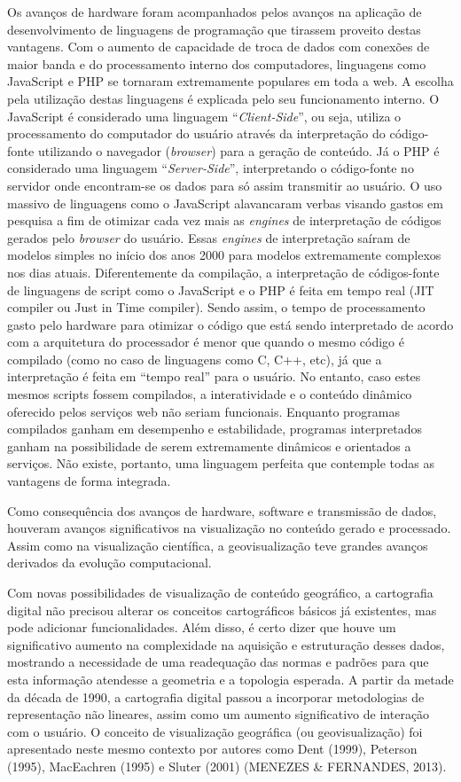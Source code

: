 Os avanços de hardware foram acompanhados pelos avanços na aplicação de desenvolvimento de linguagens de programação que tirassem proveito destas vantagens. Com o aumento de capacidade de troca de dados com conexões de maior banda e do processamento interno dos computadores, linguagens como JavaScript e PHP se tornaram extremamente populares em toda a web. A escolha pela utilização destas linguagens é explicada pelo seu funcionamento interno. O JavaScript é considerado uma linguagem “\textit{Client-Side}”, ou seja, utiliza o processamento do computador do usuário através da interpretação do código-fonte utilizando o navegador (\textit{browser}) para a geração de conteúdo. Já o PHP é considerado uma linguagem “\textit{Server-Side}”, interpretando o código-fonte no servidor onde encontram-se os dados para só assim transmitir ao usuário. O uso massivo de linguagens como o JavaScript alavancaram verbas visando gastos em pesquisa a fim de otimizar cada vez mais as \textit{engines} de interpretação de códigos gerados pelo \textit{browser} do usuário. Essas \textit{engines} de interpretação saíram de modelos simples no início dos anos 2000 para modelos extremamente complexos nos dias atuais. Diferentemente da compilação, a interpretação de códigos-fonte de linguagens de script como o JavaScript e o PHP é feita em tempo real (JIT compiler ou Just in Time compiler). Sendo assim, o tempo de processamento gasto pelo hardware para otimizar o código que está sendo interpretado de acordo com a arquitetura do processador é menor que quando o mesmo código é compilado (como no caso de linguagens como C, C++, etc), já que a interpretação é feita em “tempo real” para o usuário. No entanto, caso estes mesmos scripts fossem compilados, a interatividade e o conteúdo dinâmico oferecido pelos serviços web não seriam funcionais. Enquanto programas compilados ganham em desempenho e estabilidade, programas interpretados ganham na possibilidade de serem extremamente dinâmicos e orientados a serviços. Não existe, portanto, uma linguagem perfeita que contemple todas as vantagens de forma integrada. 

Como consequência dos avanços de hardware, software e transmissão de dados, houveram avanços significativos na visualização no conteúdo gerado e processado. Assim como na visualização científica, a geovisualização teve grandes avanços derivados da evolução computacional. 

Com novas possibilidades de visualização de conteúdo geográfico, a cartografia digital não precisou alterar os conceitos cartográficos básicos já existentes, mas pode adicionar funcionalidades. Além disso, é certo dizer que houve um significativo aumento na complexidade na aquisição e estruturação desses dados, mostrando a necessidade de uma readequação das normas e padrões para que esta informação atendesse a geometria e a topologia esperada. A partir da metade da década de 1990, a cartografia digital passou a incorporar metodologias de representação não lineares, assim como um aumento significativo de interação com o usuário. O conceito de visualização geográfica (ou geovisualização) foi apresentado neste mesmo contexto por autores como Dent (1999), Peterson (1995), MacEachren (1995) e Sluter (2001) (MENEZES \& FERNANDES, 2013). 

